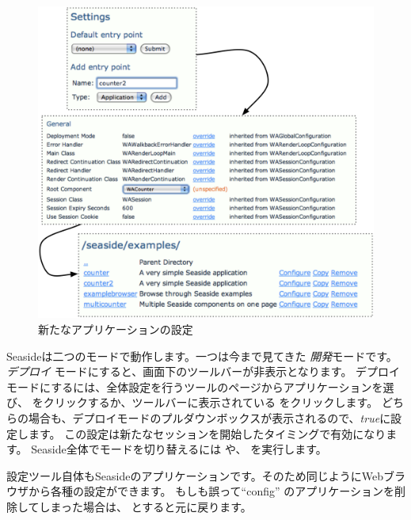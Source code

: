 \documentclass[a4paper,10pt,twoside]{book}
\begin{document}
\begin{figure}[ht]
\begin{center}
\includegraphics[width=\textwidth]{counter2}
\caption{新たなアプリケーションの設定}
\end{center}
\end{figure}

Seasideは二つのモードで動作します。一つは今まで見てきた \emph{開発}モードです。 \emph{デプロイ} モードにすると、画面下のツールバーが非表示となります。
デプロイモードにするには、全体設定を行うツールのページからアプリケーションを選び、  をクリックするか、ツールバーに表示されている  をクリックします。
どちらの場合も、デプロイモードのプルダウンボックスが表示されるので、\emph{true}に設定します。
この設定は新たなセッションを開始したタイミングで有効になります。
Seaside全体でモードを切り替えるには や、
を実行します。

設定ツール自体もSeasideのアプリケーションです。そのため同じようにWebブラウザから各種の設定ができます。
もしも誤って``config'' のアプリケーションを削除してしまった場合は、
  とすると元に戻ります。
\end{document}
